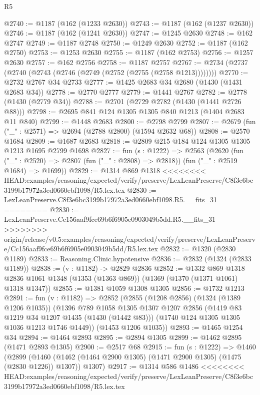\begin{lexlean}{R5}
\begin{coremodule}
{{{{{{{{{{{{{{{{{{{{{{{{{{{{{{{{{{{{{{{{{{{{{{{{{{{{{{{{{{{{{{{{{{{{{{{{{{{{{{{{{{{{@2740 := @1187 (@162 (@1233 @2630))
@2743 := @1187 (@162 (@1237 @2630))
@2746 := @1187 (@162 (@1241 @2630))
@2747 := @1245 @2630
@2748 := @162 @2747
@2749 := @1187 @2748
@2750 := @1249 @2630
@2752 := @1187 (@162 @2750)
@2753 := @1253 @2630
@2755 := @1187 (@162 @2753)
@2756 := @1257 @2630
@2757 := @162 @2756
@2758 := @1187 @2757
@2767 := @2734 (@2737 (@2740 (@2743 (@2746 (@2749 (@2752 (@2755 (@2758 @1213))))))))
@2770 := @2732 @2767 @34 @2733
@2777 := @1425 @2683 @34 @2680 (@1430 (@1431 @2683 @34))
@2778 := @2770 @2777
@2779 := @1441 @2767
@2782 := @2778 (@1430 (@2779 @34))
@2788 := @2701 (@2729 @2782 (@1430 (@1441 @2726 @88)))
@2798 := @2695 @841 @124 @1305 @1305 @840 @1213 (@1404 @2683 @11 @840)
@2799 := @1448 @2683
@2800 := @2798 @2799
@2807 := @2679 (fun ("_" : @2571) => @2694 (@2788 @2800) (@1594 @2632 @68))
@2808 := @2570 @1684
@2809 := @1687 @2683
@2818 := @2809 @215 @184 @124 @1305 @1305 @1213 @1695 @2799 @1698
@2827 := fun (s : @1222) =>
  @2563
    (@2620
      (fun ("_" : @2520) => @2807 (fun ("_" : @2808) => @2818))
      (fun ("_" : @2519 @1684) => @1699))
@2829 := @1314 @869 @1318
<<<<<<<< HEAD:examples/reasoning/expected/verify/preserve/LexLeanPreserve/C8f3e6bc3199b17972a3ed0660ebf1098/R5.lex.tex
@2830 := LexLeanPreserve.C8f3e6bc3199b17972a3ed0660ebf1098.R5.__fits_31
========
@2830 := LexLeanPreserve.Cc156aaf9fce69b6f6905e0903049b5dd.R5.__fits_31
>>>>>>>> origin/release/v0.5:examples/reasoning/expected/verify/preserve/LexLeanPreserve/Cc156aaf9fce69b6f6905e0903049b5dd/R5.lex.tex
@2832 := @1320 (@2830 @1189)
@2833 := Reasoning.Clinic.hypotensive
@2836 := @2832 (@1324 (@2833 @1189))
@2838 := (v : @1182) -> @2829 @2836
@2852 := @1332
    @869
    @1318
    @2836
    @1061
    @1348
    (@1353 (@1363 @869))
    (@1369 (@1370 (@1371 @1061) @1318 @1347))
@2855 := @1381 @1059 @1308 @1305
@2856 := @1732 @1213
@2891 := fun (v : @1182) =>
  @2852
    (@2855
      (@1208 @2856)
      (@1324 (@1389 @1206 @1035))
      (@1396
        @789
        @1058
        @1305
        @1307
        @1207
        @2856
        (@1419 @83 @1219 @34 @1207 @1435 (@1430 (@1442 @83)))
        (@1740 @124 @1305 @1305 @1036 @1213 @1746 @1449))
      (@1453 @1206 @1035))
@2893 := @1465 @1254 @34
@2894 := @1464 @2893
@2895 := @2894 @1305
@2899 := @1462 @2895 (@1471 @2893 @1305)
@2900 := @2517 @68
@2915 := fun (s : @1222) =>
  @1460
    (@2899
      (@1460 (@1462 (@1464 @2900 @1305) (@1471 @2900 @1305) (@1475 (@2830 @1226)) @1307))
      @1307)
@2917 := @1314 @586 @1486
<<<<<<<< HEAD:examples/reasoning/expected/verify/preserve/LexLeanPreserve/C8f3e6bc3199b17972a3ed0660ebf1098/R5.lex.tex
}}}}}}}}}}}}}}}}}}}}}}}}}}}}}}}}}}}}}}}}}}}}}}}}}}}}}}}}}}}}}}}}}}}}}}}}}}}}}}}}}}}}
\end{coremodule}
\end{lexlean}
